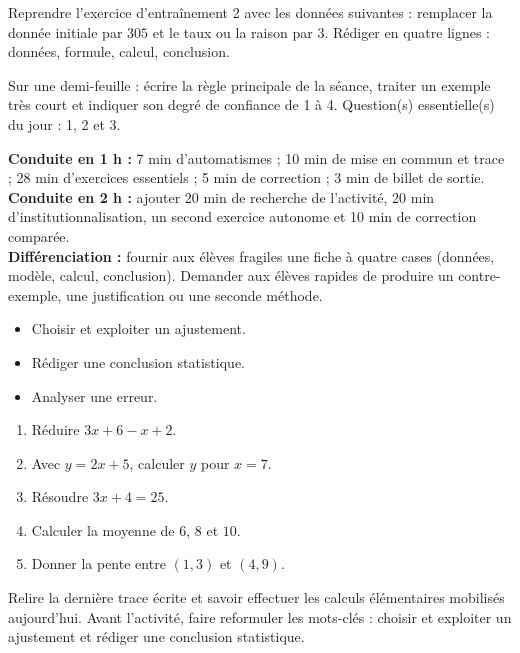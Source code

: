 
\begin{dm}Reprendre l'exercice d'entraînement 2 avec les données suivantes : remplacer la donnée initiale par $305$ et le taux ou la raison par $3$. Rédiger en quatre lignes : données, formule, calcul, conclusion.\end{dm}

\begin{sortie}Sur une demi-feuille : écrire la règle principale de la séance, traiter un exemple très court et indiquer son degré de confiance de 1 à 4. Question(s) essentielle(s) du jour : 1, 2 et 3.\end{sortie}

\ifprof
\begin{methode}
\textbf{Conduite en 1 h :} 7 min d'automatismes ; 10 min de mise en commun et trace ; 28 min d'exercices essentiels ; 5 min de correction ; 3 min de billet de sortie.\\
\textbf{Conduite en 2 h :} ajouter 20 min de recherche de l'activité, 20 min d'institutionnalisation, un second exercice autonome et 10 min de correction comparée.\\
\textbf{Différenciation :} fournir aux élèves fragiles une fiche à quatre cases (données, modèle, calcul, conclusion). Demander aux élèves rapides de produire un contre-exemple, une justification ou une seconde méthode.
\end{methode}
\fi
{}
\begin{objectifs}\begin{itemize}\item Choisir et exploiter un ajustement.\item Rédiger une conclusion statistique.\item Analyser une erreur.\end{itemize}\end{objectifs}
\begin{automatismes}\begin{enumerate}\item Réduire $3x+6-x+2$. \item Avec $y=2x+5$, calculer $y$ pour $x=7$. \item Résoudre $3x+4=25$. \item Calculer la moyenne de $6$, $8$ et $10$. \item Donner la pente entre $(1,3)$ et $(4,9)$. \end{enumerate}\end{automatismes}
\begin{prerequis}Relire la dernière trace écrite et savoir effectuer les calculs élémentaires mobilisés aujourd'hui. Avant l'activité, faire reformuler les mots-clés : choisir et exploiter un ajustement et rédiger une conclusion statistique.\end{prerequis}

